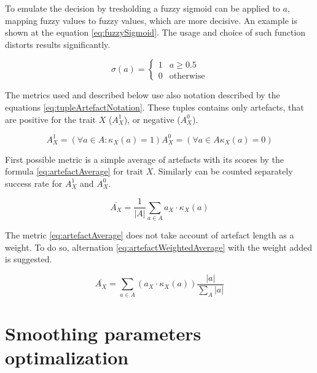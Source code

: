 To emulate the decision by tresholding a fuzzy sigmoid can be applied to $a$,
mapping fuzzy values to fuzzy values, which are more decisive. An example is
shown at the equation \ref{eq:fuzzySigmoid}. The usage and choice of such
function distorts results significantly.

\begin{equation}
\sigma(a) = \begin{cases} 1 & a \geq 0.5 \\
            0 & \text{otherwise} \end{cases}
\label{eq:fuzzySigmoid}
\end{equation}

The metrics used and described below use also notation described by the equations
\ref{eq:tupleArtefactNotation}. These tuples contains only artefacts, that are
positive for the trait $X$ ($A_{X}^{1}$), or negative ($A_{X}^{0}$).

\begin{subequations}
\begin{equation}
A_{X}^{1} = (\forall a \in A: \kappa_{X}(a) = 1)
\end{equation}
\begin{equation}
A_{X}^{0} = (\forall a \in A \kappa_{X}(a) = 0)
\end{equation}
\label{eq:tupleArtefactNotation}
\end{subequations}

First possible metric is a simple average of artefacts with its scores by the
formula \ref{eq:artefactAverage} for trait $X$. Similarly can be counted
separately success rate for $A_{X}^{1}$ and $A_{X}^{0}$.

\begin{equation}
\overline{A_{X}} = \frac{1}{|A|} \sum_{a\in A} a_{X} \cdot \kappa_{X}(a)
\label{eq:artefactAverage}
\end{equation}

The metric \ref{eq:artefactAverage} does not take account of artefact length
as a weight. To do so, alternation \ref{eq:artefactWeightedAverage} with the
weight added is suggested.

\begin{equation}
\overline{A_{X}} = \sum_{a\in A} (a_{X} \cdot \kappa_{X}(a))\frac{|a|}{\sum_{A}|a|}
\label{eq:artefactWeightedAverage}
\end{equation}

\section{Smoothing parameters optimalization}

